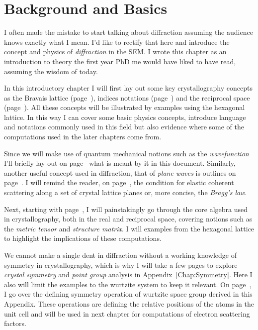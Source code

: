 \chapter{Background and Basics} %
\label{Background} 
I often made the mistake to start talking about diffraction assuming the audience knows exactly what I mean. I'd like to rectify that here and introduce the concept and physics of \textit{diffraction} in the SEM. I wrote this chapter as an introduction to theory the first year PhD me would have liked to have read, assuming the wisdom of today. 

In this introductory chapter I will first lay out some key crystallography concepts as the Bravais lattice (page~\pageref{Sect:spaceLattice}), indices notations (page~\pageref{subChap:MB indices}) and the reciprocal space (page~\pageref{sec:recMB}). All these concepts will be illustrated by examples using the hexagonal lattice. In this way I can cover some basic physics concepts, introduce language and notations commonly used in this field but also evidence where some of the computations used in the later chapters come from. 

Since we will make use of quantum mechanical notions such as the \textit{wavefunction} I'll briefly lay out on page~\pageref{sec:wave} what is meant by it in this document. Similarly, another useful concept used in diffraction, that of \textit{plane waves} is outlines on page~\pageref{Fig:planeWaves}. 
I will remind the reader, on page~\pageref{Sec:Bragg},  the condition for  elastic coherent scattering along a set of crystal lattice planes or, more concise, the \textit{Bragg's law}. 


Next, starting with page~\pageref{chap:real+recAlg}, I will painstakingly go through the core algebra used in crystallography, both in the real and reciprocal space, covering notions such as the \textit{metric tensor} and \textit{structure matrix}. I will examples from the hexagonal lattice to highlight the implications of these computations. 


We cannot make a single dent in diffraction without a working knowledge of symmetry in crystallography, which is why I will take a few pages to explore \textit{crystal symmetry} and \textit{point group} analysis in Appendix~\ref{Chap:Symmetry}. Here I also will limit the examples to the wurtzite system to keep it relevant. On page~\pageref{sec:Wsymmetry}, I go over the defining symmetry operation of wurtzite space group derived in this Appendix. These operations are defining the relative positions of the atoms in the unit cell and  will be used in next chapter for computations of electron scattering factors.  


